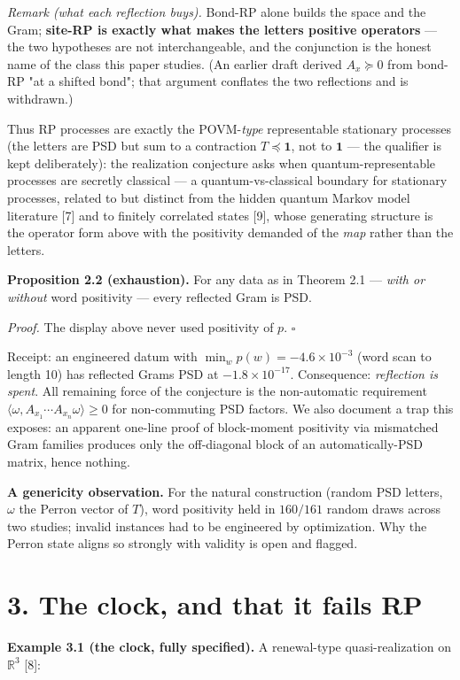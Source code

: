 \documentclass[11pt]{article}
\begin{document}
\emph{Remark (what each reflection buys).}  Bond-RP alone builds the space and the Gram; \textbf{site-RP is exactly what makes the letters positive operators} — the two hypotheses are not interchangeable, and the conjunction is the honest name of the class this paper studies.  (An earlier draft derived $A_x \succeq 0$ from bond-RP "at a shifted bond"; that argument conflates the two reflections and is withdrawn.)

Thus RP processes are exactly the POVM-\emph{type} representable stationary processes (the letters are PSD but sum to a contraction $T \preceq \mathbf 1$, not to $\mathbf 1$ — the qualifier is kept deliberately): the realization conjecture asks when quantum-representable processes are secretly classical — a quantum-vs-classical boundary for stationary processes, related to but distinct from the hidden quantum Markov model literature [7] and to finitely correlated states [9], whose generating structure is the operator form above with the positivity demanded of the \emph{map} rather than the letters.

\textbf{Proposition 2.2 (exhaustion).}  For any data as in Theorem 2.1 — \emph{with or without} word positivity — every reflected Gram is PSD.

\emph{Proof.}  The display above never used positivity of $p$.  $\square$

Receipt: an engineered datum with $\min_w p(w) = -4.6\times 10^{-3}$ (word scan to length 10) has reflected Grams PSD at $-1.8\times 10^{-17}$.  Consequence: \emph{reflection is spent}.  All remaining force of the conjecture is the non-automatic requirement $\langle\omega, A_{x_1}\cdots A_{x_n}\omega\rangle \ge 0$ for non-commuting PSD factors.  We also document a trap this exposes: an apparent one-line proof of block-moment positivity via mismatched Gram families produces only the off-diagonal block of an automatically-PSD matrix, hence nothing.

\textbf{A genericity observation.}  For the natural construction (random PSD letters, $\omega$ the Perron vector of $T$), word positivity held in $160/161$ random draws across two studies; invalid instances had to be engineered by optimization.  Why the Perron state aligns so strongly with validity is open and flagged.

\section*{3. The clock, and that it fails RP}
\textbf{Example 3.1 (the clock, fully specified).}  A renewal-type quasi-realization on $\mathbb R^3$ [8]:
\end{document}

